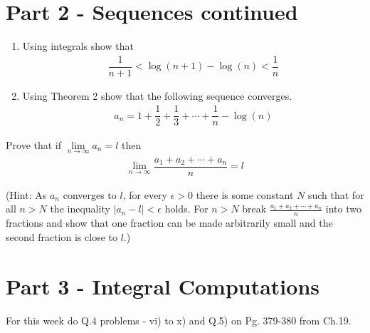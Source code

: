 \documentclass[9pt, a4paper, oneside, reqno]{amsart}
\newcommand{\hint}[1]{\footnote{\raggedleft\rotatebox{180}{Hint: #1\hfill}}}
\begin{document}
\section*{Part 2 - Sequences continued}
\begin{questions}[resume]
	\iffalse
	\item Prove directly using the definition of Cauchy sequence, that if $ a_n$ is a non-decreasing sequence bounded from above then $ a_n$ is a Cauchy sequence.\hint{Estimate $ a_n - a_m$ using $ \sup \{ a_n \}$.}
	\item Q.9 from Ch.22 on Pg.455.
	\fi
	\item
	\begin{enumerate}
		\item Using integrals show that
		      \begin{align*}
		      	\dfrac{1}{n+1} < \log(n+1) - \log(n) < \dfrac{1}{n}
		      \end{align*}
		\item Using Theorem 2 show that the following sequence converges.
		      \begin{align*}
		      	a_n = 1 + \dfrac{1}{2} + \dfrac{1}{3} + \cdots + \dfrac{1}{n} - \log(n)
		      \end{align*}
	\end{enumerate}

	\item Prove that if $ \lim \limits_{n \rightarrow \infty} a_n = l$ then
	\begin{align*}
		\lim \limits_{n \rightarrow \infty} \dfrac{a_1 + a_2 + \cdots + a_n}{n} = l
	\end{align*}

	(Hint: As $ a_n$ converges to $ l$, for every $ \epsilon > 0$ there is some constant $ N$ such that for all $ n > N$ the inequality $ |a_n - l| < \epsilon$ holds. For $ n> N$ break $ \frac{a_1 + a_2 + \cdots + a_n}{n}$ into two fractions and show that one fraction can be made arbitrarily small and the second fraction is close to $ l$.)
\end{questions}


\newpage
\section*{Part 3 - Integral Computations}
\begin{questions}[resume]
	\item For this week do Q.4 problems - vi) to x) and Q.5) on Pg. 379-380 from Ch.19. \\\\

\end{questions}
\end{document}
